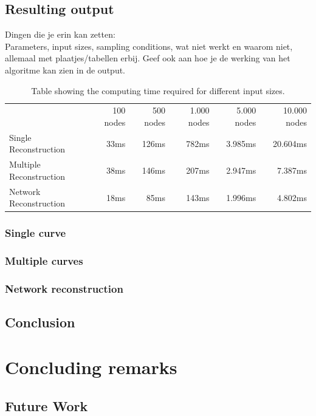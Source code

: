 \documentclass[11pt]{article}
\begin{document}
\subsection{Resulting output}
Dingen die je erin kan zetten:\\
Parameters, input sizes, sampling conditions, wat niet werkt en waarom niet, allemaal met plaatjes/tabellen erbij. Geef ook aan hoe je de werking van het algoritme kan zien in de output.

\begin{table}[ht!]
    \begin{tabular}{lrrrrr}
    ~                       & 100 nodes & 500 nodes & 1.000 nodes & 5.000 			nodes & 10.000 nodes \\
    Single Reconstruction   & 33ms      & 126ms     & 782ms       & 3.985ms     	& 20.604ms     \\
    Multiple Reconstruction & 38ms      & 146ms     & 207ms       & 2.947ms     	& 7.387ms      \\
    Network Reconstruction  & 18ms      & 85ms      & 143ms       & 1.996ms     	& 4.802ms      \\
    \end{tabular}
\caption{Table showing the computing time required for different input sizes.}
\end{table}
\subsubsection{Single curve}
\subsubsection{Multiple curves}
\subsubsection{Network reconstruction}

\subsection{Conclusion}

\section{Concluding remarks}


\subsection{Future Work}

\end{document}
